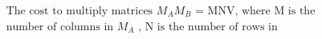 \documentclass[preview]{standalone}
\begin{document}
\begin{align*}
\text{The cost to multiply matrices } M_{A} M_{B} \text{ = MNV, where M is the} \\ \text{number of columns in } M_{A} \text{ , N is the number of rows in}
\end{align*}
\end{document}

